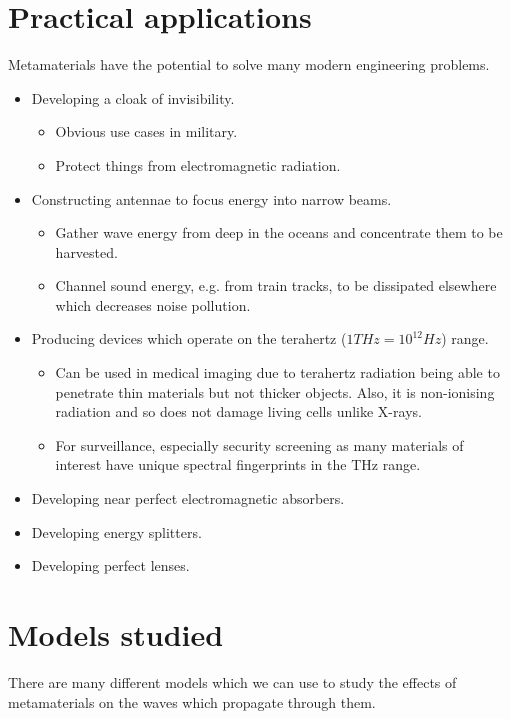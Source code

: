 \section{Practical applications}
\label{applications}
Metamaterials have the potential to solve many modern engineering problems.

\begin{itemize}
\item Developing a cloak of invisibility.\cite{emcloak}
      \begin{itemize}
      \item Obvious use cases in military.
      \item Protect things from electromagnetic radiation.
      \end{itemize}
\item Constructing antennae to focus energy into narrow beams.
      \cite{diremi,antennasol}
      \begin{itemize}
      \item Gather wave energy from deep in the oceans and concentrate them to
            be harvested.
      \item Channel sound energy, e.g. from train tracks, to be dissipated
            elsewhere which decreases noise pollution.
      \end{itemize}
\item Producing devices which operate on the terahertz ($1THz=10^{12}Hz$)
      range.\cite{THz}
      \begin{itemize}
      \item Can be used in medical imaging due to terahertz radiation being
            able to penetrate thin materials but not thicker objects. Also, it
            is non-ionising radiation and so does not damage living cells
            unlike X-rays.
      \item For surveillance, especially security screening as many materials
            of interest have unique spectral fingerprints in the THz
            range.\cite{Thzsec}
      \end{itemize}
\item Developing near perfect electromagnetic absorbers.\cite{absorbing}
\item Developing energy splitters.\cite{toposplit}
\item Developing perfect lenses.\cite{negrefraclens}
\end{itemize}

\section{Models studied}
There are many different models which we can use to study the effects of
metamaterials on the waves which propagate through them. 

